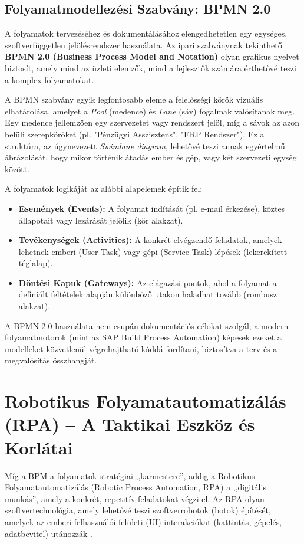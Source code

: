 \subsection{Folyamatmodellezési Szabvány: BPMN 2.0}
\label{sec:bpmn_theory}

A folyamatok tervezéséhez és dokumentálásához elengedhetetlen egy egységes, szoftverfüggetlen jelölésrendszer használata. Az ipari szabványnak tekinthető \textbf{BPMN 2.0 (Business Process Model and Notation)} olyan grafikus nyelvet biztosít, amely mind az üzleti elemzők, mind a fejlesztők számára érthetővé teszi a komplex folyamatokat.

A BPMN szabvány egyik legfontosabb eleme a felelősségi körök vizuális elhatárolása, amelyet a \textit{Pool} (medence) és \textit{Lane} (sáv) fogalmak valósítanak meg. Egy medence jellemzően egy szervezetet vagy rendszert jelöl, míg a sávok az azon belüli szerepköröket (pl. "Pénzügyi Asszisztens", "ERP Rendszer"). Ez a struktúra, az úgynevezett \textit{Swimlane diagram}, lehetővé teszi annak egyértelmű ábrázolását, hogy mikor történik átadás ember és gép, vagy két szervezeti egység között.

A folyamatok logikáját az alábbi alapelemek építik fel:
\begin{itemize}
    \item \textbf{Események (Events):} A folyamat indítását (pl. e-mail érkezése), köztes állapotait vagy lezárását jelölik (kör alakzat).
    \item \textbf{Tevékenységek (Activities):} A konkrét elvégzendő feladatok, amelyek lehetnek emberi (User Task) vagy gépi (Service Task) lépések (lekerekített téglalap).
    \item \textbf{Döntési Kapuk (Gateways):} Az elágazási pontok, ahol a folyamat a definiált feltételek alapján különböző utakon haladhat tovább (rombusz alakzat).
\end{itemize}

A BPMN 2.0 használata nem csupán dokumentációs célokat szolgál; a modern folyamatmotorok (mint az SAP Build Process Automation) képesek ezeket a modelleket közvetlenül végrehajtható kóddá fordítani, biztosítva a terv és a megvalósítás összhangját.


\section{Robotikus Folyamatautomatizálás (RPA) -- A Taktikai Eszköz és Korlátai}
\label{ssec:rpa_theory}

Míg a BPM a folyamatok stratégiai ,,karmestere'', addig a Robotikus Folyamatautomatizálás (Robotic Process Automation, RPA) a ,,digitális munkás'', amely a konkrét, repetitív feladatokat végzi el. Az RPA olyan szoftvertechnológia, amely lehetővé teszi szoftverrobotok (botok) építését, amelyek az emberi felhasználói felületi (UI) interakciókat (kattintás, gépelés, adatbevitel) utánozzák \cite{SAP-BPA-Features}.

